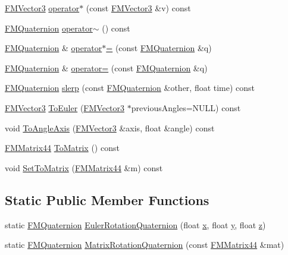 \begin{DoxyCompactItemize}
\item 
\hyperlink{classFMVector3}{FMVector3} \hyperlink{classFMQuaternion_acdb1c6fe7ba298e591f0b02f66473f75}{operator$\ast$} (const \hyperlink{classFMVector3}{FMVector3} \&v) const 
\item 
\hyperlink{classFMQuaternion}{FMQuaternion} \hyperlink{classFMQuaternion_a8d2b0223f1aeedce2555afd33c9e4ab1}{operator$\sim$} () const 
\item 
\hyperlink{classFMQuaternion}{FMQuaternion} \& \hyperlink{classFMQuaternion_ae87b85da5d464f10c85e1018452125db}{operator$\ast$=} (const \hyperlink{classFMQuaternion}{FMQuaternion} \&q)
\item 
\hyperlink{classFMQuaternion}{FMQuaternion} \& \hyperlink{classFMQuaternion_a444d9b3df7d2274a5e229feac90820d0}{operator=} (const \hyperlink{classFMQuaternion}{FMQuaternion} \&q)
\item 
\hyperlink{classFMQuaternion}{FMQuaternion} \hyperlink{classFMQuaternion_ad3d25557ffe21731997fb748f2ae132a}{slerp} (const \hyperlink{classFMQuaternion}{FMQuaternion} \&other, float time) const 
\item 
\hyperlink{classFMVector3}{FMVector3} \hyperlink{classFMQuaternion_a2131304bff68befd9926184046dc65ab}{ToEuler} (\hyperlink{classFMVector3}{FMVector3} $\ast$previousAngles=NULL) const 
\item 
void \hyperlink{classFMQuaternion_a5c5f59d725baf0181818be1a8d721dae}{ToAngleAxis} (\hyperlink{classFMVector3}{FMVector3} \&axis, float \&angle) const 
\item 
\hyperlink{classFMMatrix44}{FMMatrix44} \hyperlink{classFMQuaternion_a60ef34b284860015ce4e866a2ad31525}{ToMatrix} () const 
\item 
void \hyperlink{classFMQuaternion_a108dce988b1e4c12b513811fd9d77d04}{SetToMatrix} (\hyperlink{classFMMatrix44}{FMMatrix44} \&m) const 
\end{DoxyCompactItemize}
\subsection*{Static Public Member Functions}
\begin{DoxyCompactItemize}
\item 
static \hyperlink{classFMQuaternion}{FMQuaternion} \hyperlink{classFMQuaternion_ab23f05b76328cdb000200dd1e0d5d193}{EulerRotationQuaternion} (float \hyperlink{classFMQuaternion_a036c642a43fb84dc5544eb4ce0e0828d}{x}, float \hyperlink{classFMQuaternion_a996bf6bcb013dbbbe8e255c35e085f81}{y}, float \hyperlink{classFMQuaternion_a03d06578ec64cf8a4d2032c336153244}{z})
\item 
static \hyperlink{classFMQuaternion}{FMQuaternion} \hyperlink{classFMQuaternion_ab5c2808c525eaf712153f0be986e571a}{MatrixRotationQuaternion} (const \hyperlink{classFMMatrix44}{FMMatrix44} \&mat)
\end{DoxyCompactItemize}

